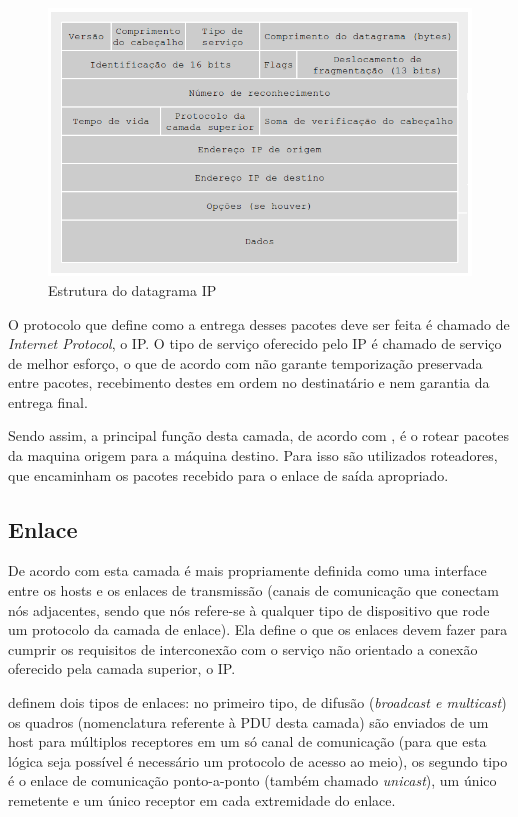\begin{figure}[H]
	\centering
    \includegraphics[width=\textwidth]{04-figuras/IPV4.png}
    \caption{Estrutura do datagrama IP}
    \label{fig:IP}
\end{figure}

O protocolo que define como a entrega desses pacotes deve ser feita é chamado de \textit{Internet Protocol}, o IP. O tipo de serviço oferecido pelo IP é chamado de serviço de melhor esforço, o que de acordo com  não garante temporização preservada entre pacotes, recebimento destes em ordem no destinatário e nem garantia da entrega final. 

Sendo assim, a principal função desta camada, de acordo com , é o rotear pacotes da maquina origem para a máquina destino. Para isso são utilizados roteadores, que encaminham os pacotes recebido para o enlace de saída apropriado.


\subsection{Enlace}

De acordo com  esta camada é mais propriamente definida como uma interface entre os hosts e os enlaces de transmissão (canais de comunicação que conectam nós adjacentes, sendo que nós refere-se à qualquer tipo de dispositivo que rode um protocolo da camada de enlace). Ela define o que os enlaces devem fazer para cumprir os requisitos de interconexão com o serviço não orientado a conexão oferecido pela camada superior, o IP.

 definem dois tipos de enlaces: no primeiro tipo, de difusão (\textit{broadcast e multicast}) os quadros (nomenclatura referente à PDU desta camada) são enviados de um host para múltiplos receptores em um só canal de comunicação (para que esta lógica seja possível é necessário um protocolo de acesso ao meio), os segundo tipo é o enlace de comunicação ponto-a-ponto (também chamado \textit{unicast}), um único remetente e um único receptor em cada extremidade do enlace.

